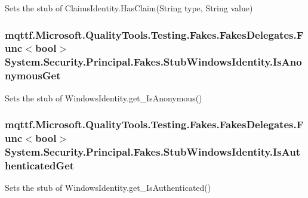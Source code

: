 Sets the stub of Claims\-Identity.\-Has\-Claim(\-String type, String value)

\hypertarget{class_system_1_1_security_1_1_principal_1_1_fakes_1_1_stub_windows_identity_a60c938ed7ccc7c8787907aeb5dc8be3a}{
\subsubsection[{Is\-Anonymous\-Get}]{\setlength{\rightskip}{0pt plus 5cm}mqttf.\-Microsoft.\-Quality\-Tools.\-Testing.\-Fakes.\-Fakes\-Delegates.\-Func$<$bool$>$ System.\-Security.\-Principal.\-Fakes.\-Stub\-Windows\-Identity.\-Is\-Anonymous\-Get}}\label{class_system_1_1_security_1_1_principal_1_1_fakes_1_1_stub_windows_identity_a60c938ed7ccc7c8787907aeb5dc8be3a}


Sets the stub of Windows\-Identity.\-get\-\_\-\-Is\-Anonymous()

\hypertarget{class_system_1_1_security_1_1_principal_1_1_fakes_1_1_stub_windows_identity_a39d59e4039b9aeb84c8b0fd9905b03c7}{
\subsubsection[{Is\-Authenticated\-Get}]{\setlength{\rightskip}{0pt plus 5cm}mqttf.\-Microsoft.\-Quality\-Tools.\-Testing.\-Fakes.\-Fakes\-Delegates.\-Func$<$bool$>$ System.\-Security.\-Principal.\-Fakes.\-Stub\-Windows\-Identity.\-Is\-Authenticated\-Get}}\label{class_system_1_1_security_1_1_principal_1_1_fakes_1_1_stub_windows_identity_a39d59e4039b9aeb84c8b0fd9905b03c7}


Sets the stub of Windows\-Identity.\-get\-\_\-\-Is\-Authenticated()

